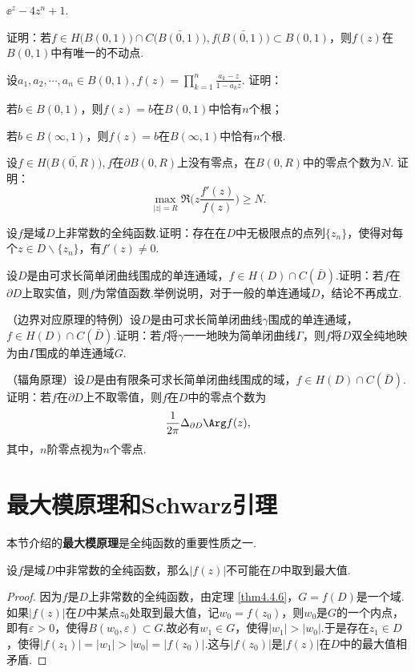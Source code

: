 \begin{xiti}
\begin{enuma}
  \item $\ee^z-4z^n+1$.
\end{enuma}
\item 证明：若$f\in H\big(B(0,1)\big)\cap C\big(\bar{B(0,1)}\big),
f\big(\bar{B(0,1)}\big)\subset B(0,1)$，则$f(z)$在$B(0,1)$中有唯一的不动点.
\item 设$a_1,a_2,\cdots,a_n\in B(0,1),f(z)=\prod_{k=1}^n\frac{a_k-z}{1-\bar a_kz}$. 证明：
\begin{enuma}
  \item 若$b\in B(0,1)$，则$f(z)=b$在$B(0,1)$中恰有$n$个根；
  \item 若$b\in B(\infty,1)$，则$f(z)=b$在$B(\infty,1)$中恰有$n$个根.
\end{enuma}
\item 设$f\in H\big(\bar{B(0,R)}\big),f$在$\partial B(0,R)$上没有零点，在$B(0,R)$中的零点个数为$N$. 证明：
    \[\max_{|z|=R}\Re\bigg(z\frac{f'(z)}{f(z)}\bigg)\ge N.\]
\item 设$f$是域$D$上非常数的全纯函数.证明：存在在$D$中无极限点的点列$\{z_n\}$，使得对每个$z\in D\backslash\{z_n\}$，有$f'(z)\ne0$.
\item 设$D$是由可求长简单闭曲线围成的单连通域，$f\in H(D)\cap C(\bar D)$.证明：若$f$在$\partial D$上取实值，则$f$为常值函数.举例说明，对于一般的单连通域$D$，结论不再成立.
\item \hypertarget{xiti4.4.17}{}（边界对应原理的特例）设$D$是由可求长简单闭曲线$\gamma$围成的单连通域，$f\in H(D)\cap C(\bar D)$.证明：若$f$将$\gamma$一一地映为简单闭曲线$\Gamma$，则$f$将$D$双全纯地映为由$\Gamma$围成的单连通域$G$.
\item （辐角原理）设$D$是由有限条可求长简单闭曲线围成的域，$f\in H(D)\cap C(\bar D)$.证明：若$f$在$\partial D$上不取零值，则$f$在$D$中的零点个数为
    \[\frac1{2\pi}\Delta_{\partial D}\Arg f(z),\]
其中，$n$阶零点视为$n$个零点.
\end{xiti}

\section{最大模原理和Schwarz引理\label{sec4.5}}
本节介绍的\textbf{最大模原理}是全纯函数的重要性质之一.
\begin{theorem}\label{thm4.5.1}
设$f$是域$D$中非常数的全纯函数，那么$|f(z)|$不可能在$D$中取到最大值.
\end{theorem}
\begin{proof}
因为$f$是$D$上非常数的全纯函数，由定理 \ref{thm4.4.6}，$G=f(D)$是一个域.如果$|f(z)|$在$D$中某点$z_0$处取到最大值，记$w_0=f(z_0)$，则$w_0$是$G$的一个内点，即有$\varepsilon>0$，使得$B(w_0,\varepsilon)\subset G$.故必有$w_1\in G$，使得$|w_1|>|w_0|$.于是存在$z_1\in D$，使得$|f(z_1)|=|w_1|>|w_0|=|f(z_0)|$.这与$|f(z_0)|$是$|f(z)|$在$D$中的最大值相矛盾.
\end{proof}

